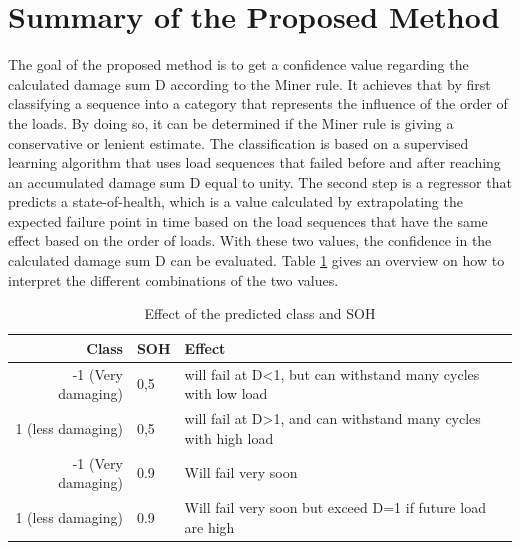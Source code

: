 \section{Summary of the Proposed Method}
The goal of the proposed method is to get a confidence value regarding the calculated damage sum D according to the Miner rule. It achieves that by first classifying a sequence into a category that represents the influence of the order of the loads. By doing so, it can be determined if the Miner rule is giving a conservative or lenient estimate. The classification is based on a supervised learning algorithm that uses load sequences that failed before and after reaching an accumulated damage sum D equal to unity. The second step is a regressor that predicts a state-of-health, which is a value calculated by extrapolating the expected failure point in time based on the load sequences that have the same effect based on the order of loads. With these two values, the confidence in the calculated damage sum D can be evaluated.
Table \ref{cases} gives an overview on how to interpret the different combinations of the two values. 

\begin{table}
	\begin{center}
		\begin{tabular}{|| r | l | l ||}
			\hline
			\rule{0pt}{2ex}Class & SOH & Effect\\
			\hline
			\hline
			\rule{0pt}{2ex}-1 (Very damaging)&  0,5 & will fail at D<1, but can withstand many cycles with low load\\\hline
			1 (less damaging)& 0,5 & will fail at D>1, and can withstand many cycles with high load\\\hline
			-1 (Very damaging)&  0.9 & Will fail very soon\\\hline
			1 (less damaging)& 0.9 & Will fail very soon but exceed D=1 if future load are high\\\hline
			\hline
		\end{tabular}
		\caption{Effect of the predicted class and SOH}
		\label{cases}
	\end{center}
	\vspace{-4mm}
\end{table}


